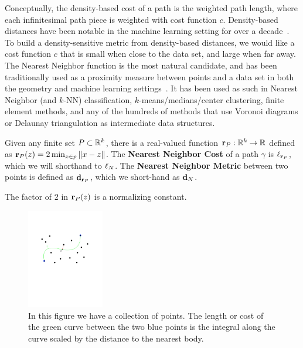 Conceptually, the density-based cost of a path is the weighted path length,
where each infinitesimal path piece is weighted with cost function $c$.
Density-based distances have been notable in the machine learning setting
for over a decade~\cite{}. To build a density-sensitive metric from density-based
distances, we would like a cost function $c$ that is small when close to
the data set, and large when far away. The Nearest Neighbor function is the
most natural candidate, and has been traditionally used as a proximity
measure between points and a data set in both the geometry and machine
learning settings~\cite{}. It has been used as such in Nearest Neighbor
(and $k$-NN) classification, $k$-means/medians/center clustering, finite
element methods, and any of the hundreds of methods that use Voronoi
diagrams or Delaunay triangulation as intermediate data structures.

\begin{definition} Given any finite set $P\subset \mathbb{R}^k$, there is a
real-valued function $\mathbf{r}_P: \mathbb{R}^k\to \mathbb{R}$ defined as
$\mathbf{r}_P(z) = 2\min_{x\in p} \|x-z\|$.  The \textbf{Nearest Neighbor Cost}
of a path $\gamma$ is $\ell_{\mathbf{r}_P}$, which we will shorthand to
$\ell_N$.  
The \textbf{Nearest Neighbor Metric} between two points is
defined as $\mathbf{d}_{\mathbf{r}_P}$, which we short-hand as $\mathbf{d}_N$.

The factor of $2$ in $\mathbf{r}_P(z)$ is a
normalizing constant.
\end{definition}
\begin{figure}[htbp]
  \centering
    \includegraphics[width=0.3\textwidth]{Figures/example.pdf}
    \caption{In this figure we have a collection of points.
      The length or cost of the green curve between the two blue points
      is the integral along the curve scaled by the distance to the nearest body.}
  \label{fig:example}
\end{figure}

